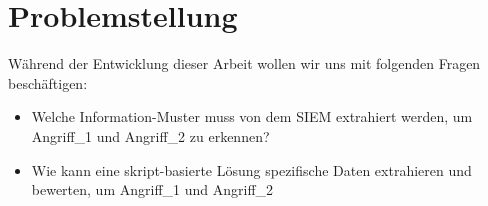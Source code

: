 \section{Problemstellung}

Während der Entwicklung dieser Arbeit wollen wir uns mit folgenden Fragen beschäftigen:

\begin{itemize}
   \item Welche Information-Muster muss von dem \gls{SIEM} extrahiert werden, um Angriff\_1 und Angriff\_2 zu erkennen?
   \item Wie kann eine skript-basierte Lösung spezifische Daten extrahieren und bewerten, um Angriff\_1 und Angriff\_2 
\end{itemize}

